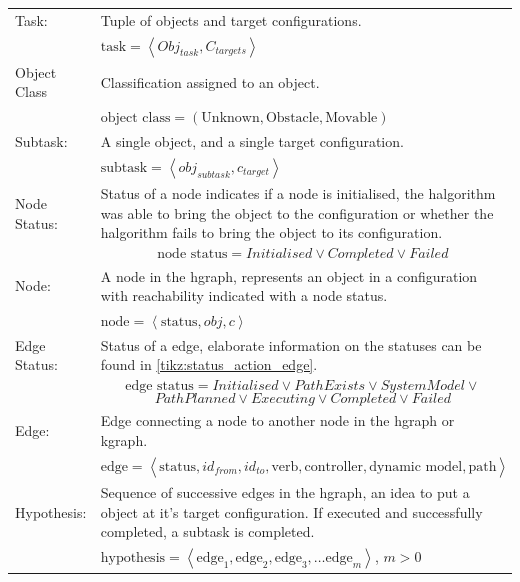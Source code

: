 \begin{table}[ht!]
\centering
\begin{tabular}[t]{l p{10cm}}
Task:   & Tuple of objects and target configurations.\\
        & $\text{task} = \left\langle Obj_{\mathit{task}}, C_{\mathit{targets}} \right\rangle$\\
Object Class & Classification assigned to an object.\\
             & $\text{object class} = (\textrm{Unknown}, \textrm{Obstacle}, \textrm{Movable})$\\
Subtask:& A single object, and a single target configuration.\\
        & $\text{subtask} = \left\langle \mathit{obj}_{\mathit{subtask}}, c_{\mathit{target}} \right\rangle$\\
Node Status:& Status of a node indicates if a node is initialised, the \ac{halgorithm} was able to bring the object to the configuration or whether the \ac{halgorithm} fails to bring the object to its configuration.\\
            & \[\textrm{node status} = \mathit{Initialised} \vee \mathit{Completed} \vee \mathit{Failed} \]\\
Node:   & A node in the \acs{hgraph}, represents an object in a configuration with reachability indicated with a node status.\\
        & $\textrm{node} = \left\langle \textrm{status}, \mathit{obj}, c \right\rangle$\\
Edge Status:& Status of a edge, elaborate information on the statuses can be found in \cref{tikz:status_action_edge}.\\
            & \[\textrm{edge status} = \mathit{Initialised} \vee \mathit{Path Exists} \vee \mathit{System Model} \vee \] \[\mathit{Path Planned} \vee \mathit{Executing} \vee \mathit{Completed} \vee \mathit{Failed}\]\\
Edge:   & Edge connecting a node to another node in the \acs{hgraph} or \ac{kgraph}.\\
        & $ \textrm{edge} = \left\langle \textrm{status}, id_{\mathit{from}}, id_{\mathit{to}}, \textrm{verb}, \textrm{controller},\textrm{dynamic model}, \textrm{path}\right\rangle$\\
Hypothesis:& Sequence of successive edges in the \ac{hgraph}, an idea to put a object at it's target configuration. If executed and successfully completed, a subtask is completed.\\
           & $ \textrm{hypothesis} = \left\langle \textrm{edge}_{1}, \textrm{edge}_{2}, \textrm{edge}_{3}, \dots \textrm{edge}_{m} \right\rangle $, \hspace{0.5cm} $m>0$\\

\end{tabular}
\end{table}
